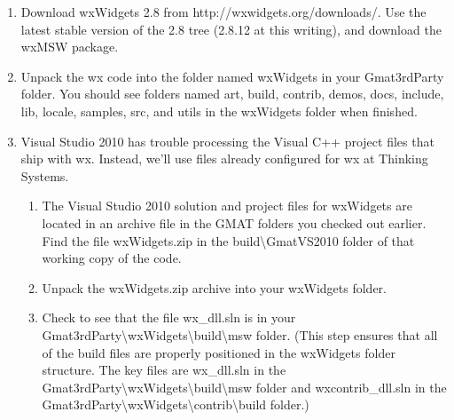 \documentclass[letterpaper,10pt]{article}%
\begin{document}
\begin{enumerate}
\item Download wxWidgets 2.8 from http://wxwidgets.org/downloads/.  Use the latest stable version of the 2.8 tree (2.8.12 at this writing), and download the wxMSW package.
\item Unpack the wx code into the folder named wxWidgets in your Gmat3rdParty folder.  You should see folders named art, build, contrib, demos, docs, include, lib, locale, samples, src, and utils in the wxWidgets folder when finished.
\item Visual Studio 2010 has trouble processing the Visual C++ project files that ship with wx.  Instead, we'll use files already configured for wx at Thinking Systems. 
\begin{enumerate}
\item The Visual Studio 2010 solution and project files for wxWidgets are located in an archive file in the GMAT folders you checked out earlier.  Find the file wxWidgets.zip in the build\textbackslash GmatVS2010 folder of that working copy of the code.
\item Unpack the wxWidgets.zip archive into your wxWidgets folder.
\item Check to see that the file wx\_dll.sln is in your Gmat3rdParty\textbackslash wxWidgets\textbackslash build\textbackslash msw folder.  (This step ensures that all of the build files are properly positioned in the wxWidgets folder structure.  The key files are wx\_dll.sln in the Gmat3rdParty\textbackslash wxWidgets\textbackslash build\textbackslash msw folder and wxcontrib\_dll.sln in the Gmat3rdParty\textbackslash wxWidgets\textbackslash contrib\textbackslash build folder.) 
\end{enumerate}
 
\end{enumerate}
\end{document}

